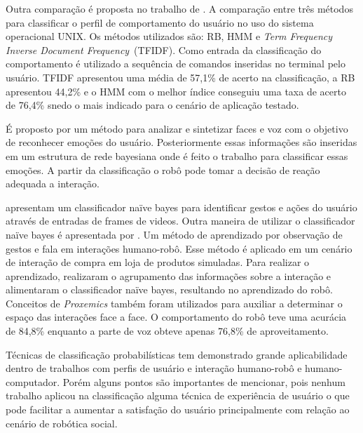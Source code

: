 Outra comparação é proposta no trabalho de . A comparação entre três métodos para classificar o perfil de comportamento do usuário no uso do sistema operacional UNIX. Os métodos utilizados são: RB, HMM e \emph{Term Frequency Inverse Document Frequency}~(TFIDF). Como entrada da classificação do comportamento é utilizado a sequência de comandos inseridas no terminal pelo usuário. TFIDF apresentou uma média de 57,1\% de acerto na classificação, a RB apresentou 44,2\% e o HMM com o melhor índice conseguiu uma taxa de acerto de 76,4\% snedo o mais indicado para o cenário de aplicação testado.

É proposto por  um método para analizar e sintetizar faces e voz com o objetivo de reconhecer emoções do usuário. Posteriormente essas informações são inseridas em um estrutura de rede bayesiana onde é feito o trabalho para classificar essas emoções. A partir da classificação o robô pode tomar a decisão de reação adequada a interação.

 apresentam um classificador naïve bayes para identificar gestos e ações do usuário através de entradas de frames de videos. Outra maneira de utilizar o classificador naïve bayes é apresentada por . Um método de aprendizado por observação de gestos e fala em interações humano-robô. Esse método é aplicado em um cenário de interação de compra em loja de produtos simuladas. Para realizar o aprendizado,  realizaram o agrupamento das informações sobre a interação e alimentaram o classificador naïve bayes, resultando no aprendizado do robô. Conceitos de \emph{Proxemics} também foram utilizados para auxiliar a determinar o espaço das interações face a face. O comportamento do robô teve uma acurácia de 84,8\% enquanto a parte de voz obteve apenas 76,8\% de aproveitamento.

Técnicas de classificação probabilísticas tem demonstrado grande aplicabilidade dentro de trabalhos com perfis de usuário e interação humano-robô e humano-computador. Porém alguns pontos são importantes de mencionar, pois nenhum trabalho aplicou na classificação alguma técnica de experiência de usuário o que pode facilitar a aumentar a satisfação do usuário principalmente com relação ao cenário de robótica social.
